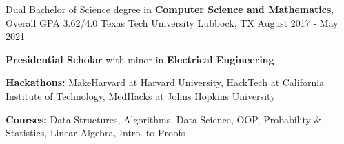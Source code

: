
\begin{cventries}
  \cventry
    {Dual Bachelor of Science degree in \textbf{Computer Science and Mathematics}, Overall GPA 3.62/4.0} %
    {Texas Tech University} %
    {Lubbock, TX} %
    {August 2017 - May 2021} %
    {
      \begin{cvitems} %
         \item { \textbf{Presidential Scholar} with minor in \textbf{Electrical Engineering}}
         \item {\textbf{Hackathons:} MakeHarvard at Harvard University, HackTech at California Institute of Technology, MedHacks at Johns Hopkins University }
         \item {\textbf{Courses: } Data Structures, Algorithms, Data Science, OOP, Probability \& Statistics, Linear Algebra, Intro. to Proofs}
         \end{cvitems}
    }
\end{cventries}

